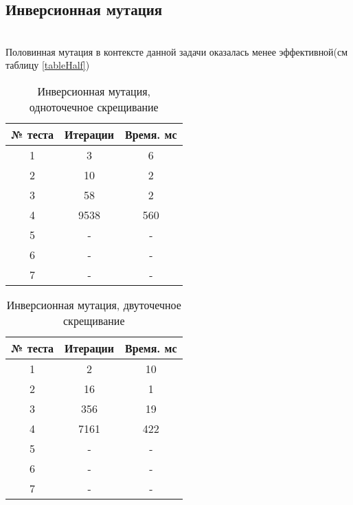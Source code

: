 \subsection{Инверсионная мутация}
\\Половинная мутация в контексте данной задачи оказалась менее эффективной(см таблицу \ref{tableHalf})

\begin{table}[]
\centering
\caption{Инверсионная мутация, одноточечное скрещивание}
\label{InvMutSingleCross}
\begin{tabular}{|c|c|c|}
\hline
№ теста & Итерации & Время. мс \\ \hline
1       & 3        & 6         \\ \hline
2       & 10       & 2         \\ \hline
3       & 58       & 2         \\ \hline
4       & 9538     & 560       \\ \hline
5       & -        & -         \\ \hline
6       & -        & -         \\ \hline
7       & -        & -         \\ \hline
\end{tabular}
\end{table}

\begin{table}[]
\centering
\caption{Инверсионная мутация, двуточечное скрещивание}
\label{InvMutDoubleCross}
\begin{tabular}{|c|c|c|}
\hline
№ теста & Итерации & Время. мс \\ \hline
1       & 2        & 10        \\ \hline
2       & 16       & 1         \\ \hline
3       & 356      & 19        \\ \hline
4       & 7161     & 422       \\ \hline
5       & -        & -         \\ \hline
6       & -        & -         \\ \hline
7       & -        & -         \\ \hline
\end{tabular}
\end{table}

